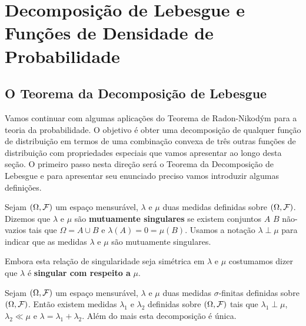 \chapter[Aula 14]{Decomposição de Lebesgue e Funções de Densidade de Probabilidade}
\chaptermark{}

\section{O Teorema da Decomposição de Lebesgue}

Vamos continuar com algumas aplicações do Teorema 
de Radon-Nikodým para a teoria da probabilidade.
O objetivo é obter uma decomposição de qualquer 
função de distribuição em termos de uma combinação 
convexa de três outras funções de distribuição 
com propriedades especiais que vamos apresentar
ao longo desta seção. O primeiro passo nesta
direção será o Teorema da Decomposição de Lebesgue 
e para apresentar seu enunciado preciso vamos 
introduzir algumas definições. 


\begin{definicao}
Sejam $(\Omega,\mathcal{F})$ um espaço mensurável,
$\lambda$ e $\mu$ duas medidas definidas 
sobre $(\Omega,\mathcal{F})$.
Dizemos que $\lambda$ e $\mu$ são 
{\bf mutuamente singulares} 
se existem conjuntos $A$ $B$ não-vazios 
tais que $\Omega = A\cup B$ e $\lambda(A)=0=\mu(B)$.
Usamos a notação $\lambda\perp \mu$ para indicar 
que as medidas $\lambda$ e $\mu$ são mutuamente 
singulares. 
\end{definicao}


Embora esta relação de singularidade seja simétrica 
em $\lambda$ e $\mu$ costumamos dizer que $\lambda$
é {\bf singular com respeito a} $\mu$.


\begin{teorema}
\label{teo-decomposicao-lebesgue}
Sejam $(\Omega,\mathcal{F})$ um espaço mensurável,
$\lambda$ e $\mu$ duas medidas $\sigma$-finitas 
definidas sobre $(\Omega,\mathcal{F})$.
Então existem medidas 
$\lambda_1$ e $\lambda_2$ definidas sobre  $(\Omega,\mathcal{F})$
tais que $\lambda_1\perp \mu$, $\lambda_2\ll \mu$ 
e $\lambda = \lambda_1+\lambda_2$. Além do mais esta 
decomposição é única.
\end{teorema}




